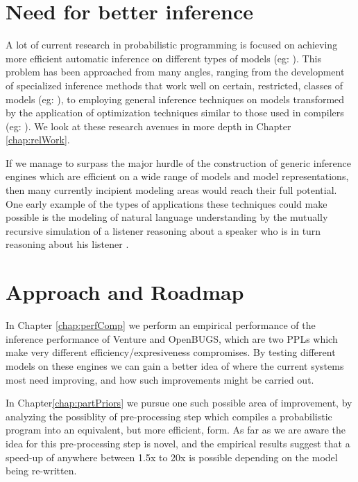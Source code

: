 \section{Need for better inference}
\label{sect:betInf}
A lot of current research in probabilistic programming is focused on achieving more efficient automatic inference on different types of models (eg: \cite{goodman2013principles, wingate2011nonstandard, wood2014new}). This problem has been approached from many angles, ranging from the development of specialized inference methods that work well on certain, restricted, classes of models (eg: \cite{stuhlmuller2012dynamic, yeh2012synthesizing}), to employing general inference techniques on models transformed by the application of optimization techniques similar to those used in compilers (eg: \cite{mansinghka2014venture, yang2013incrementalizing}). We look at these research avenues in more depth in Chapter \ref{chap:relWork}.

If we manage to surpass the major hurdle of the construction of generic inference engines which are efficient on a wide range of models and model representations, then many currently incipient modeling areas would reach their full potential. One early example of the types of applications these techniques could make possible is the modeling of natural language understanding by the mutually recursive simulation of a listener reasoning about a speaker who is in turn reasoning about his listener \cite{goodman2013knowledge, frank2012predicting}. 

\section{Approach and Roadmap}
In Chapter \ref{chap:perfComp} we perform an empirical performance of the inference performance of Venture and OpenBUGS, which are two PPLs which make very different efficiency/expresiveness compromises. By testing different models on these engines we can gain a better idea of where the current systems most need improving, and how such improvements might be carried out. 

In Chapter\ref{chap:partPriors} we pursue one such possible area of improvement, by analyzing the possiblity of pre-processing step which compiles a probabilistic program into an equivalent, but more efficient, form. As far as we are aware the idea for this pre-processing step is novel, and the empirical results suggest that a speed-up of anywhere between 1.5x to 20x is possible depending on the model being re-written. 

